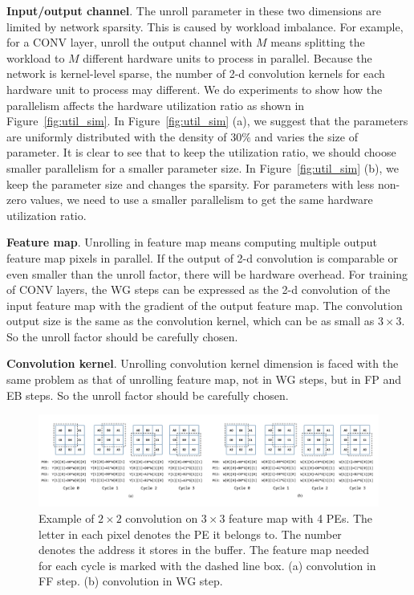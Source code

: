 {\bf{Input/output channel}}. The unroll parameter in these two dimensions are limited by network sparsity. This is caused by workload imbalance. For example, for a CONV layer, unroll the output channel with $M$ means splitting the workload to $M$ different hardware units to process in parallel. Because the network is kernel-level sparse, the number of 2-d convolution kernels for each hardware unit to process may different. We do experiments to show how the parallelism affects the hardware utilization ratio as shown in Figure~\ref{fig:util_sim}. In Figure~\ref{fig:util_sim} (a), we suggest that the parameters are uniformly distributed with the density of $30\%$ and varies the size of parameter. It is clear to see that to keep the utilization ratio, we should choose smaller parallelism for a smaller parameter size. In Figure~\ref{fig:util_sim} (b), we keep the parameter size and changes the sparsity. For parameters with less non-zero values, we need to use a smaller parallelism to get the same hardware utilization ratio. 

{\bf{Feature map}}. Unrolling in feature map means computing multiple output feature map pixels in parallel. If the output of 2-d convolution is comparable or even smaller than the unroll factor, there will be hardware overhead. For training of CONV layers, the WG steps can be expressed as the 2-d convolution of the input feature map with the gradient of the output feature map. The convolution output size is the same as the convolution kernel, which can be as small as $3\times 3$. So the unroll factor should be carefully chosen.

{\bf{Convolution kernel}}. Unrolling convolution kernel dimension is faced with the same problem as that of unrolling feature map, not in WG steps, but in FP and EB steps. So the unroll factor should be carefully chosen.

\begin{figure}[t]
  \centering
  \includegraphics[width=2.0\columnwidth]{figures/mmap.pdf}
  \caption{Example of $2\times 2$ convolution on $3\times 3$ feature map with 4 PEs. The letter in each pixel denotes the PE it belongs to. The number denotes the address it stores in the buffer. The feature map needed for each cycle is marked with the dashed line box. (a) convolution in FF step. (b) convolution in WG step.}
  \label{fig:mmap}
\end{figure}


